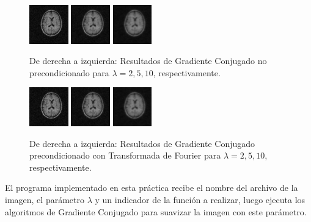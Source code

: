 \documentclass[10pt,journal,compsoc]{styles/IEEEtran}
\begin{document}
\begin{figure}[H]
	\centering
	\includegraphics[width=0.15\textwidth]{ConjGrad2.png}
	\includegraphics[width=0.15\textwidth]{ConjGrad5.png}
	\includegraphics[width=0.15\textwidth]{ConjGrad10.png}
	
	\caption{De derecha a izquierda: Resultados de Gradiente Conjugado no precondicionado para $\lambda=2,5,10$, respectivamente.}
\end{figure}

\begin{figure}[H]
	\centering
	\includegraphics[width=0.15\textwidth]{FourierConjGrad2.png}
	\includegraphics[width=0.15\textwidth]{FourierConjGrad5.png}
	\includegraphics[width=0.15\textwidth]{FourierConjGrad10.png}
	
	\caption{De derecha a izquierda: Resultados de Gradiente Conjugado precondicionado con Transformada de Fourier para $\lambda=2,5,10$, respectivamente.}
\end{figure}

El programa implementado en esta práctica recibe el nombre del archivo de la imagen, el parámetro $\lambda$ y un indicador de la función a realizar, luego ejecuta los algoritmos de Gradiente Conjugado para suavizar la imagen con este parámetro.
\end{document}
